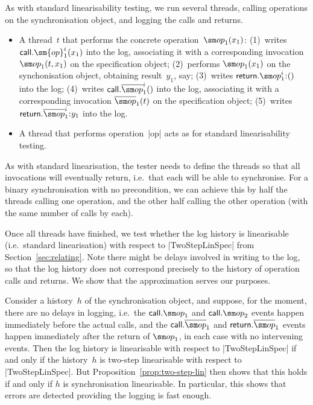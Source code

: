 As with standard linearisability testing, we run several threads, calling
operations on the synchronisation object, and logging the calls and returns. 
%
\begin{itemize}
\item A thread~$t$ that performs the concrete operation~$\op_1(x_1)$: (1)~writes
  $\call.\sm{op}_1^i(x_1)$ into the log, associating it with a corresponding
  invocation $\op_1(t, x_1)$ on the specification object; (2)~performs
  $\op_1(x_1)$ on the synchonisation object, obtaining result~$y_1$, say;
  (3)~writes $\return.\op_1^i \:: ()$ into the log; (4)~writes
  $\call.\overline{\op}_1^i()$ into the log, associating it with a
  corresponding invocation $\overline{\op}_1(t)$ on the specification object;
  (5)~writes $\return.\overline{\op}_1^i \:: y_1$ into the log.

\item A thread that performs operation~|op| acts as for standard
  linearisability testing.
\end{itemize}
%
%



As with standard linearisation, the tester needs to define the
threads so that all invocations will eventually return, i.e.~that each will be
able to synchronise.  For a binary synchronisation with no precondition, we
can achieve this by half the threads calling one operation, and the other half
calling the other operation (with the same number of calls by each).

Once all threads have finished, we test whether the log history is
linearisable (i.e.~standard linearisation) with respect to |TwoStepLinSpec|
from Section~\ref{sec:relating}.
%
Note there might be delays involved in writing to the log, so that the log
history does not correspond precisely to the history of operation calls and
returns.  We show that the approximation serves our purposes.


Consider a history~$h$ of the synchronisation object, and suppose, for the
moment, there are no delays in logging, i.e.~the $\call.\op_1$ and
$\call.\op_2$ events happen immediately before the actual calls, and the
$\call.\overline\op_1$ and $\return.\overline\op_1$ events happen immediately
after the return of $\op_1$, in each case with no intervening events.  Then
the log history is linearisable with respect to |TwoStepLinSpec| if and only
if the history~$h$ is two-step linearisable with respect to |TwoStepLinSpec|.
But Proposition~\ref{prop:two-step-lin} then shows that this holds if and only
if $h$ is synchronisation linearisable.  In particular, this shows that errors
are detected providing the logging is fast enough.

